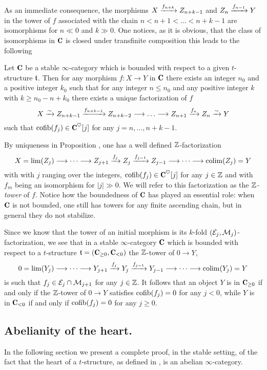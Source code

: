 As an immediate consequence, the morphisms $X \xrightarrow{f_{n+k}} Z_{n+k-1}$ and $Z_{n} \xrightarrow{f_{n-1}} Y$ in the tower of $f$ associated with the chain $n<n+1<\dots<n+k-1$ are isomorphisms for $n\ll 0$ and $k \gg 0$. One notices, as it is obvious, that the class of isomorphisms in $\C$ is closed under transfinite composition this leads to the following
\begin{proposition}\label{prop.Z.Postnikov}
Let $\C$ be a stable $\infty$-category which is bounded with respect to a given $t$-structure $\mathfrak{t}$. 
Then for any morphism $f\colon X\to Y$  in $\C$ there exists an integer $n_0$ and a positive integer $k_0$ such that for any integer $n\leq n_0$ and any positive integer $k$ with $k\geq n_0-n+k_0$ there exists a unique factorization of $f$ 
\[
X \xto{\sim} Z_{n+k-1} \xto{f_{n+k-1}}Z_{n+k-2}\to\dots\to Z_{n+1} \xto{f_{n}} Z_{n} \xto{\sim} Y
\]
such that
$\cofib(f_j)\in \C^\heart[j]$ for any $j=n,\dots,n+k-1$.
\end{proposition}
\begin{remark}\label{oss.Z.Postnikov}
By uniqueness in Proposition , one has a well defined $\mathbb{Z} $-factorization
\[
X=\lim(Z_j) \longrightarrow\cdots \longrightarrow Z_{j+1} \xrightarrow{f_{j}} Z_{j} \xrightarrow{f_{j-1}}Z_{j-1}\longrightarrow \cdots\longrightarrow \mathrm{colim}(Z_j)=Y
\]
with 
with $j$ ranging over the integers, $\cofib(f_j)\in \C^\heart[j]$ for any $j\in \mathbb{Z} $ and with $f_m$ being an isomorphism for $|j|\gg 0$. We will refer to this factorization as the \emph{$\mathbb{Z} $-tower} of $f$. Notice how the boundedness of $\C$ has played an essential role: when $\C$ is not bounded, one still has towers for any finite ascending chain, but in general they do not stabilize.
\end{remark}
\begin{remark}\label{oss.for.Heart.to.t}
Since we know that the tower of an initial morphism is its $k$-fold $(\mathcal{E}_j,\mathcal{M}_j)$-factorization, we see that in a stable $\infty$-category $\C$ which is bounded with respect to a $t$-structure $\tee=(\C_{\geq 0},\C_{<0})$ the $\mathbb{Z} $-tower of $0\to Y$,
\[
0=\lim(Y_j) \longrightarrow\cdots \longrightarrow Y_{j+1} \xrightarrow{f_{j}} Y_{j} \xrightarrow{f_{j-1}}Y_{j-1}\longrightarrow \cdots\longrightarrow \mathrm{colim}(Y_j)=Y
\]
is such that $f_j\in \mathcal{E}_j\cap\mathcal{M}_{j+1}$ for any $j\in \mathbb{Z} $. It follows that an object $Y$ is in $\C_{\geq 0}$ if and only if the $\mathbb{Z} $-tower of $0\to Y$
satisfies $\operatorname{cofib}(f_j)=0$ for any $j< 0$, while $Y$ is in $\C_{<0}$ if and only if  $\operatorname{cofib}(f_j)=0$ for any $j\geq 0$.
\end{remark}
\subsection{Abelianity of the heart.}
In the following section we present a complete proof, in the stable setting, of the fact that the heart of a $t$-structure, as defined in \cite[Def. \textbf{1.2.1.11}]{LurieHA}, is an abelian $\infty$-category. 


